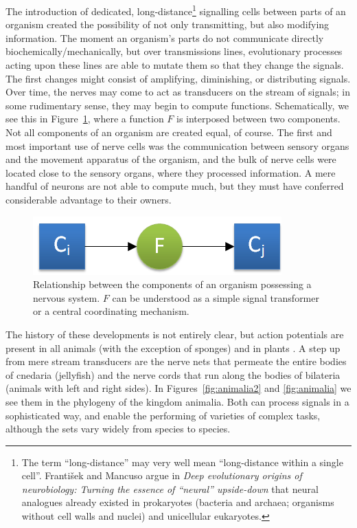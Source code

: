 The introduction of dedicated, long-distance\footnote{The term ``long-distance'' may very well mean ``long-distance within a single cell''. Franti\v{s}ek and Mancuso argue in {\em Deep evolutionary origins of neurobiology: Turning the essence of ``neural'' upside-down} \cite{frantisek} that neural analogues already existed in prokaryotes (bacteria and archaea; organisms without cell walls and nuclei) and unicellular eukaryotes.} signalling cells between parts of an organism created the possibility of not only transmitting, but also modifying information. The moment an organism's parts do not communicate directly biochemically/mechanically, but over transmissions lines, evolutionary processes acting upon these lines are able to mutate them so that they change the signals. The first changes might consist of amplifying, diminishing, or distributing signals. Over time, the nerves may come to act as transducers on the stream of signals; in some rudimentary sense, they may begin to compute functions. Schematically, we see this in Figure~\ref{fig:nervousSystem}, where a function $F$ is interposed between two components. Not all components of an organism are created equal, of course. The first and most important use of nerve cells was the communication between sensory organs and the movement apparatus of the organism, and the bulk of nerve cells were located close to the sensory organs, where they processed information. A mere handful of neurons are not able to compute much, but they must have conferred considerable advantage to their owners.

\begin{figure}
	\centering
	\includegraphics{figs/nervousSystem.png}
	\caption{Relationship between the components of an organism possessing a nervous system. $F$ can be understood as a simple signal transformer or a central coordinating mechanism.}
	\label{fig:nervousSystem}
\end{figure}

The history of these developments is not entirely clear, but action potentials are present in all animals (with the exception of sponges) and in plants \cite{Leys01051999, PCE:PCE1614}. 
A step up from mere stream transducers are the nerve nets that permeate the entire bodies of cnedaria (jellyfish) and the nerve cords that run along the bodies of bilateria (animals with left and right sides). In Figures~\ref{fig:animalia2} and \ref{fig:animalia} we see them in the phylogeny of the kingdom animalia. Both can process signals in a sophisticated way, and enable the performing of varieties of complex tasks, although the sets vary widely from species to species.

